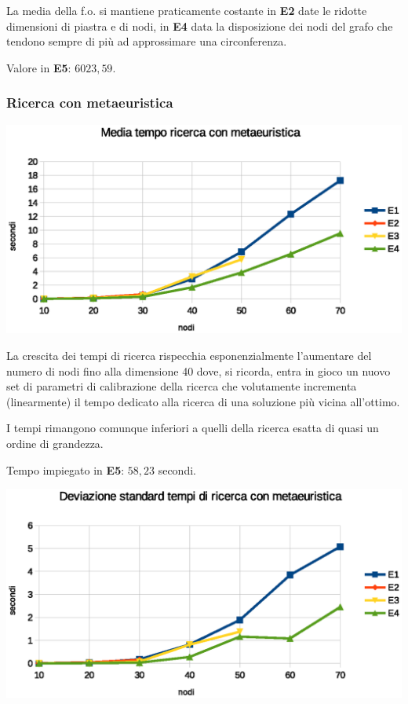 \documentclass[a4paper]{article}
\begin{document}
                
                La media della f.o. si mantiene praticamente costante in \textbf{E2} date le ridotte dimensioni di piastra e di nodi, in \textbf{E4} data la disposizione dei nodi del grafo che tendono sempre di pi\`u ad
                approssimare una circonferenza.

                Valore in \textbf{E5}: $6023,59$.

            \subsubsection{Ricerca con metaeuristica}

                    \includegraphics[scale=0.7]{img/gavgtime}

                    La crescita dei tempi di ricerca rispecchia esponenzialmente l'aumentare del numero di nodi fino alla dimensione 40 dove, si ricorda, entra in gioco un nuovo set di parametri di calibrazione della ricerca che volutamente incrementa (linearmente) il tempo dedicato alla ricerca di una soluzione pi\`u vicina all'ottimo.

                    I tempi rimangono comunque inferiori a quelli della ricerca esatta di quasi un ordine di grandezza.

                    Tempo impiegato in \textbf{E5}: $58,23$ secondi.

                    \includegraphics[scale=0.7]{img/gadevtime}
\end{document}
